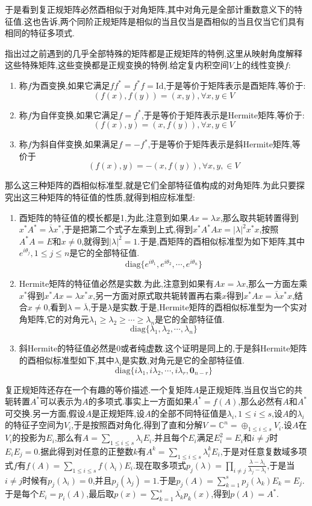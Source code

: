 于是看到复正规矩阵必然酉相似于对角矩阵,其中对角元是全部计重数意义下的特征值.这也告诉,两个同阶正规矩阵是相似的当且仅当是酉相似的当且仅当它们具有相同的特征多项式.

指出过之前遇到的几乎全部特殊的矩阵都是正规矩阵的特例,这里从映射角度解释这些特殊矩阵,这些变换都是正规变换的特例.给定复内积空间$V$上的线性变换$f$:
\begin{enumerate}
	\item 称$f$为酉变换,如果它满足$ff^*=f^*f=\mathrm{Id}$,于是等价于矩阵表示是酉矩阵,等价于:
	$$(f(x),f(y))=(x,y),\forall x,y\in V$$
	\item 称$f$为自伴变换,如果它满足$f=f^*$,于是等价于矩阵表示是Hermite矩阵,等价于:$$(f(x),y)=(x,f(y)),\forall x,y\in V$$
	\item 称$f$为斜自伴变换,如果满足$f=-f^*$,于是等价于矩阵表示是斜Hermite矩阵,等价于$$(f(x),y)=-(x,f(y)),\forall x,y,\in V$$
\end{enumerate}

那么这三种矩阵的酉相似标准型,就是它们全部特征值构成的对角矩阵.为此只要探究出这三种矩阵的特征值的性质,就得到相应标准型:
\begin{enumerate}
	\item 酉矩阵的特征值的模长都是1,为此,注意到如果$Ax=\lambda x$,那么取共轭转置得到$x^*A^*=\overline{\lambda}x^*$,于是把第二个式子左乘到上式,得到$x^*A^*Ax=|\lambda|^2x^*x$,按照$A^*A=E$和$x\not=0$,就得到$|\lambda|^2=1$.于是,酉矩阵的酉相似标准型为如下矩阵,其中$e^{i\theta_j},1\le j\le n$是它的全部特征值.
	$$\mathrm{diag}\{e^{i\theta_1},e^{i\theta_2},\cdots,e^{i\theta_n}\}$$
	\item Hermite矩阵的特征值必然是实数.为此,注意到如果有$Ax=\lambda x$,那么一方面左乘$x^*$得到$x^*Ax=\lambda x^*x$,另一方面对原式取共轭转置再右乘$x$得到$x^*Ax=\overline{\lambda}x^*x$,结合$x\not=0$,看到$\lambda=\overline{\lambda}$,于是$\lambda$是实数.于是,Hermite矩阵的酉相似标准型为一个实对角矩阵,它的对角元$\lambda_1\ge\lambda_2\ge\cdots\ge\lambda_n$是它的全部特征值.
	$$\mathrm{diag}\{\lambda_1,\lambda_2,\cdots,\lambda_n\}$$
	\item 斜Hermite的特征值必然是0或者纯虚数.这个证明是同上的,于是斜Hermite矩阵的酉相似标准型如下,其中$\lambda_i$是实数,对角元是它的全部特征值.
	$$\mathrm{diag}\{i\lambda_1,i\lambda_2,\cdots,i\lambda_r,\textbf{0}_{n-r}\}$$
\end{enumerate}

复正规矩阵还存在一个有趣的等价描述.一个复矩阵$A$是正规矩阵,当且仅当它的共轭转置$A^*$可以表示为$A$的多项式.事实上一方面如果$A^*=f(A)$,那么必然有$A$和$A^*$可交换.另一方面,假设$A$是正规矩阵,设$A$的全部不同特征值是$\lambda_i,1\le i\le s$,设$A$的$\lambda_i$的特征子空间为$V_i$,于是按照酉对角化,得到了直和分解$V=\mathbb{C}^n=\oplus_{1\le i\le s}V_i$.设$A$在$V_i$的投影为$E_i$,那么有$A=\sum_{1\le i\le s}\lambda_iE_i$.并且每个$E_i$满足$E_i^2=E_i$和$i\not=j$时$E_iE_j=0$.据此得到对任意的正整数$k$有$A^k=\sum_{1\le i\le s}\lambda_i^kE_i$,于是对任意复数域多项式$f$有$f(A)=\sum_{1\le i\le s}f(\lambda_i)E_i$.现在取多项式$p_j(\lambda)=\prod_{i\not=j}\frac{\lambda-\lambda_i}{\lambda_j-\lambda_i}$,于是当$i\not=j$时候有$p_j(\lambda_i)=0$,并且$p_j(\lambda_j)=1$.于是$p_j(A)=\sum_{k=1}^{s}p_j(\lambda_k)E_k=E_j$.于是每个$E_i=p_i(A)$,最后取$p(x)=\sum_{k=1}^{s}\overline{\lambda_k}p_k(x)$,得到$p(A)=A^*$.

